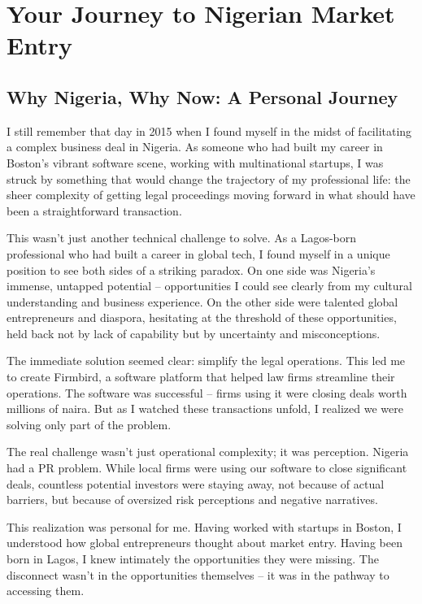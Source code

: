 
\chapter*{Your Journey to Nigerian Market Entry}

\section{Why Nigeria, Why Now: A Personal Journey}

I still remember that day in 2015 when I found myself in the midst of facilitating a complex business deal in Nigeria. As someone who had built my career in Boston's vibrant software scene, working with multinational startups, I was struck by something that would change the trajectory of my professional life: the sheer complexity of getting legal proceedings moving forward in what should have been a straightforward transaction.

This wasn't just another technical challenge to solve. As a Lagos-born professional who had built a career in global tech, I found myself in a unique position to see both sides of a striking paradox. On one side was Nigeria's immense, untapped potential – opportunities I could see clearly from my cultural understanding and business experience. On the other side were talented global entrepreneurs and diaspora, hesitating at the threshold of these opportunities, held back not by lack of capability but by uncertainty and misconceptions.

The immediate solution seemed clear: simplify the legal operations. This led me to create Firmbird, a software platform that helped law firms streamline their operations. The software was successful – firms using it were closing deals worth millions of naira. But as I watched these transactions unfold, I realized we were solving only part of the problem.

The real challenge wasn't just operational complexity; it was perception. Nigeria had a PR problem. While local firms were using our software to close significant deals, countless potential investors were staying away, not because of actual barriers, but because of oversized risk perceptions and negative narratives.

This realization was personal for me. Having worked with startups in Boston, I understood how global entrepreneurs thought about market entry. Having been born in Lagos, I knew intimately the opportunities they were missing. The disconnect wasn't in the opportunities themselves – it was in the pathway to accessing them.

